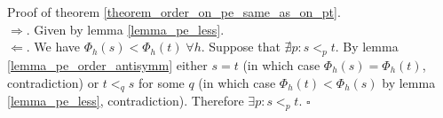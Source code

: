 \documentclass[AMA,STIX1COL]{WileyNJD-v2}
\begin{document}
    Proof of theorem \ref{theorem_order_on_pe_same_as_on_pt}.
    \\[-1em]

    $\Rightarrow$. Given by lemma \ref{lemma_pe_less}.
    \\[-1em]

    $\Leftarrow$.
    We have $\Phi_{h}(s) < \Phi_{h}(t) \; \forall h$.
    Suppose that $\nexists p: s <_p t$.
    By lemma \ref{lemma_pe_order_antisymm} either $s = t$
    (in which case $\Phi_{h}(s) = \Phi_{h}(t)$, contradiction)
    or $t <_q s$ for some $q$
    (in which case $\Phi_{h}(t) < \Phi_{h}(s)$ by lemma \ref{lemma_pe_less}, contradiction).
    Therefore $\exists p: s <_p t$.
    $\square$
\end{document}
